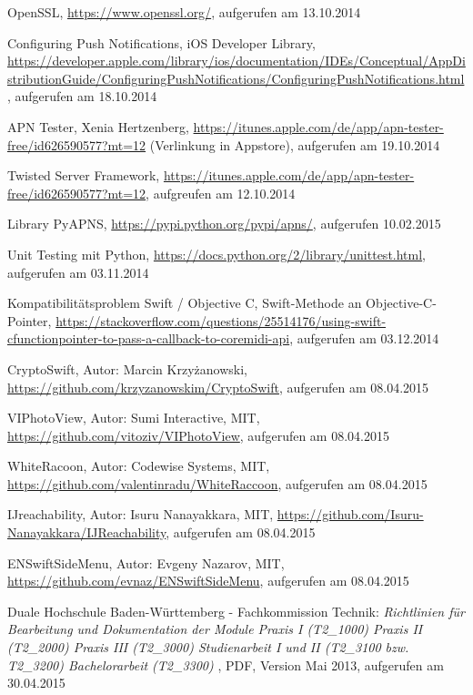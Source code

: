 \begin{thebibliography}{x}
   OpenSSL, \url{https://www.openssl.org/}, aufgerufen am 13.10.2014
  
   Configuring Push Notifications, iOS Developer Library, \url{https://developer.apple.com/library/ios/documentation/IDEs/Conceptual/AppDistributionGuide/ConfiguringPushNotifications/ConfiguringPushNotifications.html}, aufgerufen am 18.10.2014
  
   APN Tester, Xenia Hertzenberg, \url{https://itunes.apple.com/de/app/apn-tester-free/id626590577?mt=12} (Verlinkung in Appstore), aufgerufen am 19.10.2014
  
   Twisted Server Framework, \url{https://itunes.apple.com/de/app/apn-tester-free/id626590577?mt=12}, aufgreufen am 12.10.2014
  
   Library PyAPNS, \url{https://pypi.python.org/pypi/apns/}, aufgerufen 10.02.2015
  
   Unit Testing mit Python, \url{https://docs.python.org/2/library/unittest.html}, aufgerufen am 03.11.2014
  
   Kompatibilitätsproblem Swift / Objective C, Swift-Methode an Objective-C-Pointer, \url{https://stackoverflow.com/questions/25514176/using-swift-cfunctionpointer-to-pass-a-callback-to-coremidi-api}, aufgerufen am 03.12.2014
  
   CryptoSwift, Autor: Marcin Krzyżanowski, \url{https://github.com/krzyzanowskim/CryptoSwift}, aufgerufen am 08.04.2015
  
   VIPhotoView, Autor: Sumi Interactive, MIT, \url{https://github.com/vitoziv/VIPhotoView}, aufgerufen am 08.04.2015
  
   WhiteRacoon, Autor: Codewise Systems, MIT, \url{https://github.com/valentinradu/WhiteRaccoon}, aufgerufen am 08.04.2015
  
   IJreachability, Autor: Isuru Nanayakkara,  MIT, \url{https://github.com/Isuru-Nanayakkara/IJReachability}, aufgerufen am 08.04.2015
  
   ENSwiftSideMenu, Autor: Evgeny Nazarov, MIT, \url{https://github.com/evnaz/ENSwiftSideMenu}, aufgerufen am 08.04.2015
  
    Duale Hochschule Baden-Württemberg - Fachkommission Technik:
    {\sl Richtlinien
    	für Bearbeitung und Dokumentation der Module
    	Praxis I (T2\_1000)
    	Praxis II (T2\_2000)
    	Praxis III (T2\_3000)
    	Studienarbeit I und II (T2\_3100 bzw. T2\_3200)
    	Bachelorarbeit (T2\_3300) }, PDF, Version Mai 2013, aufgerufen am 30.04.2015
    
  
\end{thebibliography}
\clearpage
\pagebreak


